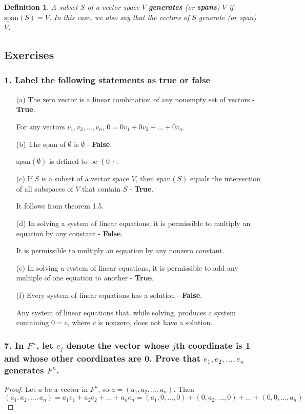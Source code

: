 \documentclass{article}
\newtheorem*{definition}{Definition}
\begin{document}
\begin{definition}
	A subset $S$ of a vector space $V$ \textbf{generates} (or \textbf{spans}) $V$ if $\text{span}(S) = V$. In this case, we also say that the vectors of $S$ generate (or span) $V$.
\end{definition}

\subsection*{Exercises}

\subsubsection*{1. Label the following statements as true or false}
\begin{enumerate}
	\item[(a)] The zero vector is a linear combination of any nonempty set of vectors - \textbf{True}.
	
	For any vectors $v_1, v_2, \dots, v_n$, $0 = 0v_1 + 0v_2 + \dots + 0v_n$.
	\item[(b)] The span of $\emptyset$ is $\emptyset$ - \textbf{False}.
	
	$\text{span}(\emptyset)$ is defined to be $\left\{0\right\}$.
	\item[(c)] If $S$ is a subset of a vector space $V$, then $\text{span}(S)$ equals the intersection of all subspaces of $V$ that contain $S$ - \textbf{True}.
	
	It follows from theorem 1.5.
	\item[(d)] In solving a system of linear equations, it is permissible to multiply an equation by any constant - \textbf{False}.
	
	It is permissible to multiply an equation by any nonzero constant.
	\item[(e)] In solving a system of linear equations, it is permissible to add any multiple of one equation to another - \textbf{True}.
	\item[(f)] Every system of linear equations has a solution - \textbf{False}.
	
	Any system of linear equations that, while solving, produces a system containing $0 = c$, where $c$ is nonzero, does not have a solution.
\end{enumerate}

\subsubsection*{7. In $F^n$, let $e_j$ denote the vector whose $j$th coordinate is 1 and whose other coordinates are 0. Prove that $e_1, e_2, \dots, e_n$ generates $F^n$.}
\begin{proof}
	Let $a$ be a vector in $F^n$, so $a = \left(a_1, a_2, \dots, a_n\right)$. Then \[ \left(a_1, a_2, \dots, a_n\right) = a_1e_1 + a_2e_2 + \dots + a_ne_n = (a_1, 0, \dots, 0) + (0, a_2, \dots, 0) + \dots + (0, 0, \dots, a_n) \]
\end{proof}
\end{document}
